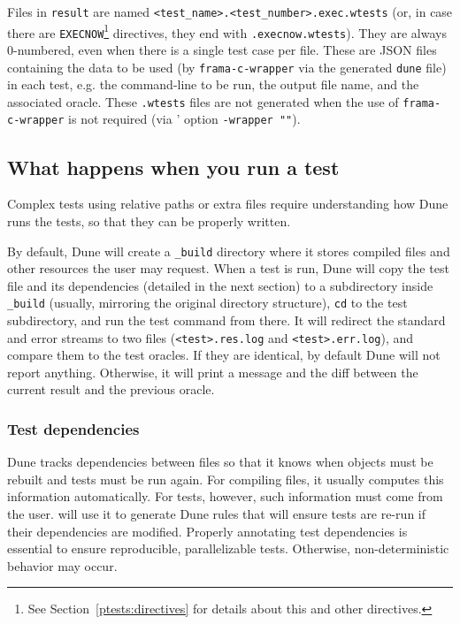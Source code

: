 Files in \verb|result| are named \verb|<test_name>.<test_number>.exec.wtests|
(or, in case there are \verb|EXECNOW|\footnote{See
Section~\ref{ptests:directives} for details about this and other directives.}
directives, they end with \verb|.execnow.wtests|). They are always 0-numbered,
even when there is a single test case per file.
These are JSON files containing the data to be used (by \verb|frama-c-wrapper|
via the generated \verb|dune| file) in each test, e.g.
the command-line to be run, the output file name, and the associated oracle.
These \verb|.wtests| files are not generated when the use of \verb|frama-c-wrapper|
is not required (via \ptests' option \verb|-wrapper ""|).

\subsection{What happens when you run a test}\label{ptests:inside}

Complex tests using relative paths or extra files require understanding how
Dune runs the tests, so that they can be properly written.

By default, Dune will create a \verb|_build| directory where it stores compiled
files and other resources the user may request. When a test is run, Dune will
copy the test file and its dependencies (detailed in the next section)
to a subdirectory inside \verb|_build| (usually, mirroring the original
directory structure), \verb|cd| to the test subdirectory, and run the test
command from there. It will redirect the standard and error streams to
two files (\verb|<test>.res.log| and \verb|<test>.err.log|), and compare them
to the test oracles. If they are identical, by default Dune will not report
anything. Otherwise, it will print a message and the diff between the current
result and the previous oracle.

\subsubsection{Test dependencies}\label{ptests:dependencies}

Dune tracks dependencies between files so that it knows when objects must be
rebuilt and tests must be run again. For compiling \ocaml files, it usually
computes this information automatically. For tests, however, such information
must come from the user. \ptests will use it to generate Dune rules that
will ensure tests are re-run if their dependencies are modified.
Properly annotating test dependencies is essential to ensure reproducible,
parallelizable tests. Otherwise, non-deterministic behavior may occur.

